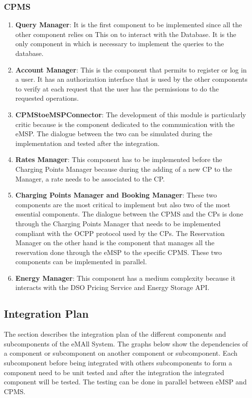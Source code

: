 \subsubsection{CPMS}
\begin{enumerate}
    \item \textbf{Query Manager}: It is the first component to be implemented since all the other component relies on This
    on to interact with the Database. It is the only component in which is necessary to implement the queries to the database.
    \item \textbf{Account Manager}: This is the component that permits to register or log in a user. It has an authorization interface that 
    is used by the other components to verify at each request that the user has the permissions to do the requested operations.
    \item \textbf{CPMStoeMSPConnector}: The development of this module is particularly critic because is the component dedicated
    to the communication with the eMSP. The dialogue between the two can be simulated during the implementation and tested after the integration.
    \item \textbf{Rates Manager}: This component has to be implemented before the Charging Points Manager because during the adding 
    of a new CP to the Manager, a rate needs to be associated to the CP.
    \item \textbf{Charging Points Manager and Booking Manager}: These two components are the most critical to implement but also two 
    of the most essential components. The dialogue between the CPMS and the CPs is done through the Charging Points Manager that 
    needs to be implemented compliant with the OCPP protocol used by the CPs. The Reservation Manager on the other hand is the component
    that manages all the reservation done through the eMSP to the specific CPMS. These two components can be implemented in parallel.
    \item \textbf{Energy Manager}: This component has a medium complexity because it interacts with the DSO Pricing Service and Energy Storage API. 
\end{enumerate}

\subsection{Integration Plan}
The section describes the integration plan of the different components and subcomponents of the eMAll System. 
The graphs below show the dependencies of a component or subcomponent on another component or subcomponent. Each subcomponent before being integrated with others subcomponents
to form a component need to be unit tested and after the integration the integrated component will be tested.
The testing can be done in parallel between eMSP and CPMS.
